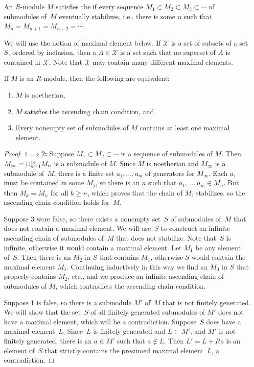 \begin{definition}
An $R$-module $M$ satisfies the  if
every sequence $M_1\subset M_2 \subset M_3 \subset \cdots$ of
submodules of~$M$ eventually stabilizes, i.e., there is some $n$ such
that $M_n=M_{n+1}=M_{n+2}=\cdots$.
\end{definition}
We will use the notion of maximal element below.  If $\mathcal{X}$ is
a set of subsets of a set $S$, ordered by inclusion, then a
 $A\in \mathcal{X}$ is a set such that no superset
of $A$ is contained in $\mathcal{X}$.  Note that $\mathcal{X}$ may 
contain many different maximal elements.

\begin{proposition}
If $M$ is an $R$-module, then the following are equivalent:
\begin{enumerate}
\item $M$ is noetherian,
\item $M$ satisfies the ascending chain condition, and
\item Every nonempty set of submodules of $M$ contains at least one
maximal element.  
\end{enumerate}
\end{proposition}
\begin{proof}
{\bf $1\implies 2$:} Suppose $M_1\subset M_2\subset \cdots$ is a
sequence of submodules of $M$.  Then $M_\infty=\cup_{n=1}^{\infty}
M_n$ is a submodule of $M$.  Since $M$ is noetherian and $M_\infty$
is a submodule of~$M$, there is a
finite set $a_1,\ldots, a_m$ of generators for $M_{\infty}$.  Each $a_i$
must be contained in some $M_j$, so there is an $n$ such that
$a_1,\ldots, a_m\in M_n$.  But then $M_{k}=M_n$ for all $k\geq n$,
which proves that the chain of $M_i$ stabilizes, 
so the ascending chain condition holds for~$M$.

 Suppose 3 were false, so there exists
a nonempty set~$S$ of submodules of~$M$ that does not contain a
maximal element.  We will use~$S$ to construct an infinite ascending
chain of submodules of~$M$ that does not stabilize.  Note that~$S$ is
infinite, otherwise it would contain a maximal element.  Let $M_1$ be
any element of~$S$.  Then there is an $M_2$ in $S$ that contains
$M_1$, otherwise $S$ would contain the maximal element $M_1$.
Continuing inductively in this way we find an $M_3$ in $S$ that
properly contains $M_2$, etc., and we produce an infinite ascending
chain of submodules of $M$, which contradicts the ascending chain
condition.

 Suppose 1 is false, so there is a
submodule $M'$ of~$M$ that is not finitely generated.  We will show
that the set~$S$ of all finitely generated submodules of $M'$ does not
have a maximal element, which will be a contradiction.  Suppose~$S$
does have a maximal element~$L$.  Since~$L$ is finitely generated and
$L\subset M'$, and $M'$ is not finitely generated, there is an $a\in
M'$ such that $a\not\in L$.  Then $L'=L+Ra$ is an element of~$S$ that
strictly contains the presumed maximal element~$L$, a contradiction.
\end{proof}

